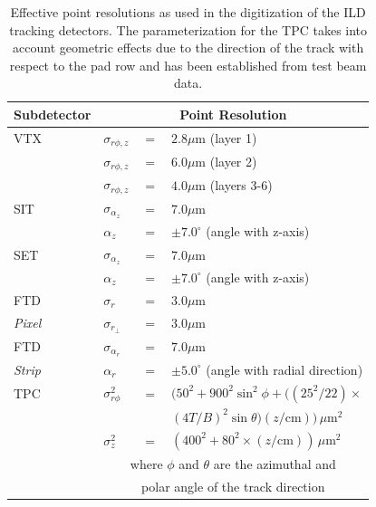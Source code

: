 \begin{table}[htbp]
\renewcommand{\arraystretch}{1.25}

\centering\small
\begin{tabular}{llcl}
\hline
 Subdetector &  \multicolumn{3}{c}{ Point Resolution }  \\
\hline
        VTX    &  $ \sigma_{r\phi,z}  $ & $=$ & $ 2.8 \mu\mathrm{m}$   (layer 1)   \\
               &  $ \sigma_{r\phi,z}  $ & $=$ & $ 6.0 \mu\mathrm{m}$   (layer 2)   \\
               &  $ \sigma_{r\phi,z}  $ & $=$ & $ 4.0 \mu\mathrm{m}$   (layers 3-6)   \\


        SIT    &  $ \sigma_{\alpha_{z}}   $ & $=$ & $ 7.0 \mu\mathrm{m}$    \\
               &  $  \alpha_{z}         $ & $=$ & $ \pm 7.0^\circ $ (angle with z-axis)        \\

        SET    &  $ \sigma_{\alpha_{z}}   $ & $=$ & $ 7.0 \mu\mathrm{m}$    \\
               &  $  \alpha_{z}         $ & $=$ & $ \pm 7.0^\circ $ (angle with z-axis)        \\

       FTD     &  $\sigma_{r}$      & $=$ & $ 3.0 \mu\mathrm{m}$    \\
  \emph{Pixel} &  $ \sigma_{r_\perp}$  & $=$ & $ 3.0 \mu\mathrm{m}$    \\

     FTD       &  $ \sigma_{\alpha_r}   $ & $=$ & $ 7.0 \mu\mathrm{m}$    \\
  \emph{Strip} &  $ \alpha_{r}         $ & $=$ & $ \pm 5.0^\circ $ (angle with radial direction)        \\

       TPC    &  $ \sigma^2_{r\phi} $ & $=$ & $ \bigl( 50^2+900^2\sin^2\phi + \bigl( (25^2/22)\times$  \\
              &                      &     &   $(4T/B)^2\sin\theta\bigr) (z/\mathrm{cm}) \bigr)\,\mu\mathrm{m}^2$  \\
               &  $ \sigma^2_{z}    $ & $=$ & $ (400^2+80^2\times (z/\mathrm{cm})) \,\mu\mathrm{m}^2 $ \\
               &   \multicolumn{3}{c}{ where $\phi$ and $\theta$ are the azimuthal and} \\
               &   \multicolumn{3}{c}{ polar angle of the track direction } \\
\hline
\end{tabular}
\caption[Simulated ILD tracking point resolutions.]{Effective point resolutions as used in the digitization of the ILD tracking detectors.
  The parameterization for the TPC takes into account geometric effects due to the direction of the track with respect to the pad row and
  has been established from test beam data.
        \label{tab:ild_trk_res} }
\end{table}

